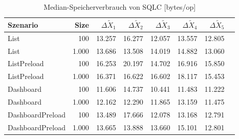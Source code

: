 
\begin{table}[ht]
\setlength{\extrarowheight}{-1pt}
\centering
\caption{Median-Speicherverbrauch von SQLC [bytes/op]}
\begin{tabular}{lrrrrrrr}
\toprule
Szenario & Size & ${\Delta \tilde{X}_1}$ & ${\Delta \tilde{X}_2}$ & ${\Delta \tilde{X}_3}$ & ${\Delta \tilde{X}_4}$ & ${\Delta \tilde{X}_5}$ \\
\midrule
	List & 100 & \cellcolor{green!4}  13.257 & \cellcolor{red!3}  16.277 & \cellcolor{green!8}  12.057 & \cellcolor{green!3}  13.557 & \cellcolor{green!6}  12.805 \\
	List & 1.000 & \cellcolor{green!2}  13.686 & \cellcolor{green!4}  13.508 & \cellcolor{green!2}  14.019 & \cellcolor{red!3}  14.882 & \cellcolor{green!3}  13.060 \\
	ListPreload & 100 & \cellcolor{green!8}  16.253 & \cellcolor{red!3}  20.197 & \cellcolor{green!13}  14.702 & \cellcolor{green!5}  16.916 & \cellcolor{green!10}  15.850 \\
	ListPreload & 1.000 & \cellcolor{green!8}  16.371 & \cellcolor{green!7}  16.622 & \cellcolor{green!9}  16.602 & \cellcolor{green!2}  18.117 & \cellcolor{green!10}  15.453 \\
	Dashboard & 100 & \cellcolor{green!14}  11.606 & \cellcolor{green!6}  14.737 & \cellcolor{green!20}  10.441 & \cellcolor{green!13}  11.483 & \cellcolor{green!16}  11.222 \\
	Dashboard & 1.000 & \cellcolor{green!14}  12.162 & \cellcolor{green!13}  12.290 & \cellcolor{green!14}  11.865 & \cellcolor{green!8}  13.159 & \cellcolor{green!15}  11.475 \\
	DashboardPreload & 100 & \cellcolor{green!14}  13.489 & \cellcolor{green!4}  17.666 & \cellcolor{green!21}  12.078 & \cellcolor{green!14}  13.168 & \cellcolor{green!18}  12.791 \\
	DashboardPreload & 1.000 & \cellcolor{green!17}  13.665 & \cellcolor{green!15}  13.888 & \cellcolor{green!15}  13.660 & \cellcolor{green!9}  15.101 & \cellcolor{green!18}  12.801 \\
\bottomrule
\end{tabular}
\label{tab:speicherverbrauch_sqlc}
\end{table}
	
